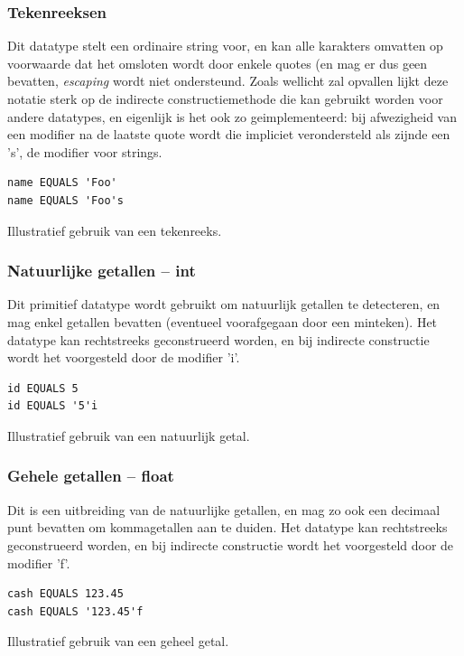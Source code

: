 \subsubsection{Tekenreeksen}

Dit datatype stelt een ordinaire string voor, en kan alle karakters omvatten op voorwaarde dat het omsloten wordt door enkele quotes (en mag er dus geen bevatten, \emph{escaping} wordt niet ondersteund. Zoals wellicht zal opvallen lijkt deze notatie sterk op de indirecte constructiemethode die kan gebruikt worden voor andere datatypes, en eigenlijk is het ook zo geimplementeerd: bij afwezigheid van een modifier na de laatste quote wordt die impliciet verondersteld als zijnde een 's', de modifier voor strings.

\begin{code}
\begin{verbatim}
name EQUALS 'Foo'
name EQUALS 'Foo's
\end{verbatim}
\caption{Illustratief gebruik van een tekenreeks.}
\end{code}

\subsubsection{Natuurlijke getallen -- int}

Dit primitief datatype wordt gebruikt om natuurlijk getallen te detecteren, en mag enkel getallen bevatten (eventueel voorafgegaan door een minteken). Het datatype kan rechtstreeks geconstrueerd worden, en bij indirecte constructie wordt het voorgesteld door de modifier 'i'.

\begin{code}
\begin{verbatim}
id EQUALS 5
id EQUALS '5'i
\end{verbatim}
\caption{Illustratief gebruik van een natuurlijk getal.}
\end{code}

\subsubsection{Gehele getallen -- float}

Dit is een uitbreiding van de natuurlijke getallen, en mag zo ook een decimaal punt bevatten om kommagetallen aan te duiden. Het datatype kan rechtstreeks geconstrueerd worden, en bij indirecte constructie wordt het voorgesteld door de modifier 'f'.

\begin{code}
\begin{verbatim}
cash EQUALS 123.45
cash EQUALS '123.45'f
\end{verbatim}
\caption{Illustratief gebruik van een geheel getal.}
\end{code}

